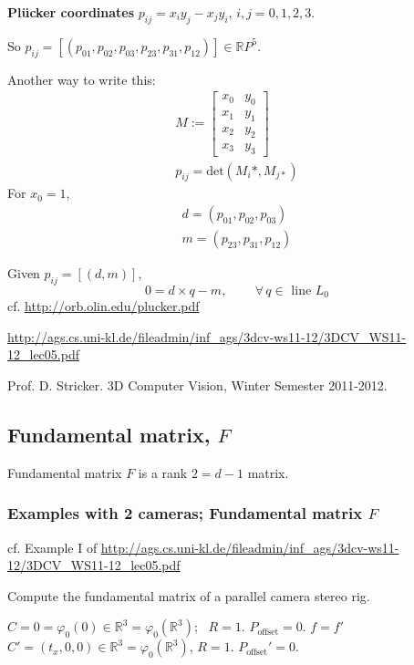 \documentclass[10pt]{amsart}
\begin{document}
\begin{multicols*}{2}
\textbf{Pl\"{u}cker coordinates} $p_{ij} = x_i y_j - x_j y_i $, $i,j=0,1,2,3$.  

So $p_{ij} = [(p_{01}, p_{02}, p_{03}, p_{23}, p_{31}, p_{12}) ] \in \mathbb{R}P^5$.  

Another way to write this:  
\[
\begin{gathered}
	M:= \left[ \begin{matrix} x_0 & y_0 \\ x_1 & y_1 \\ x_2 & y_2 \\ x_3 & y_3 \end{matrix} \right] \\
 p_{ij}  =\text{det}(M_i*, M_{j*} )
\end{gathered}
\]
For $x_0=1$, 
\begin{equation}
\begin{gathered}
d=(p_{01},p_{02}, p_{03}) \\
m = (p_{23}, p_{31},p_{12}) \end{gathered}
\end{equation}

Given $p_{ij} = [(d,m)]$, 
\begin{equation}
0 = d\times q - m, \qquad \, \forall \, q \in \text{ line } L_0
\end{equation}
cf. \url{http://orb.olin.edu/plucker.pdf}



\url{http://ags.cs.uni-kl.de/fileadmin/inf_ags/3dcv-ws11-12/3DCV_WS11-12_lec05.pdf}  

Prof. D. Stricker.  3D Computer Vision, Winter Semester 2011-2012.  

\subsection{Fundamental matrix, $F$}

Fundamental matrix $F$ is a rank $2=d-1$ matrix.  

\subsubsection{Examples with 2 cameras; Fundamental matrix $F$}

cf. Example I of \url{http://ags.cs.uni-kl.de/fileadmin/inf_ags/3dcv-ws11-12/3DCV_WS11-12_lec05.pdf}  

Compute the fundamental matrix of a parallel camera stereo rig.  

$C=0=\varphi_0(0) \in \mathbb{R}^3 = \varphi_0(\mathbb{R}^3) $; \quad \, $R=1$.  $P_{\text{offset}}=0$.  $f=f'$  \\
$C'=(t_x,0,0) \in \mathbb{R}^3 = \varphi_0(\mathbb{R}^3)$, $R=1$.  $P_{\text{offset}}' = 0$.  


\end{multicols*}
\end{document}
